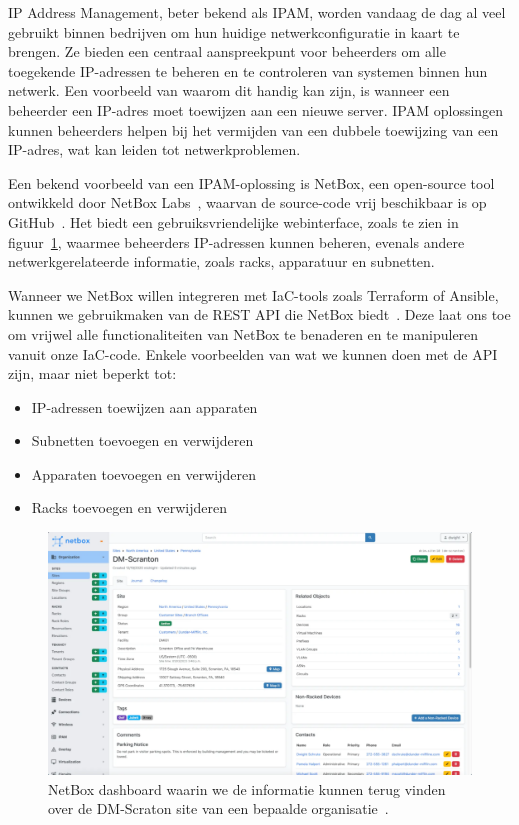 IP Address Management, beter bekend als IPAM, worden vandaag de dag al veel gebruikt binnen bedrijven om hun huidige netwerkconfiguratie in kaart te brengen.
Ze bieden een centraal aanspreekpunt voor beheerders om alle toegekende IP-adressen te beheren en te controleren van systemen binnen hun netwerk.
Een voorbeeld van waarom dit handig kan zijn, is wanneer een beheerder een IP-adres moet toewijzen aan een nieuwe server.
IPAM oplossingen kunnen beheerders helpen bij het vermijden van een dubbele toewijzing van een IP-adres, wat kan leiden tot netwerkproblemen.

Een bekend voorbeeld van een IPAM-oplossing is NetBox, een open-source tool ontwikkeld door NetBox Labs~\autocite{netbox-ipam}, waarvan de source-code vrij beschikbaar is op GitHub~\autocite{netbox-github}.
Het biedt een gebruiksvriendelijke webinterface, zoals te zien in figuur~\ref{fig:netbox-dashboard}, waarmee beheerders IP-adressen kunnen beheren, evenals andere netwerkgerelateerde informatie, zoals racks, apparatuur en subnetten.

Wanneer we NetBox willen integreren met IaC-tools zoals Terraform of Ansible, kunnen we gebruikmaken van de REST API die NetBox biedt~\autocite{netbox-api}.
Deze laat ons toe om vrijwel alle functionaliteiten van NetBox te benaderen en te manipuleren vanuit onze IaC-code.
Enkele voorbeelden van wat we kunnen doen met de API zijn, maar niet beperkt tot:

\begin{itemize}
    \item IP-adressen toewijzen aan apparaten
    \item Subnetten toevoegen en verwijderen
    \item Apparaten toevoegen en verwijderen
    \item Racks toevoegen en verwijderen
\end{itemize}

\begin{figure}[h!]
    \includegraphics[width=\textwidth]
    {./graphics/state-of-the-art/netbox-dashboard.png}
    \caption[NetBox dashboard voor DM-Scraton.]{\label{fig:netbox-dashboard}NetBox dashboard waarin we de informatie kunnen terug vinden over de DM-Scraton site van een bepaalde organisatie~\autocite{netbox-dashboard}.}
\end{figure}

